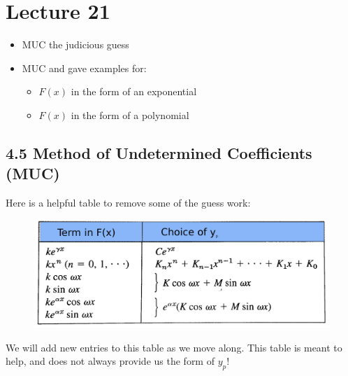 \chapter*{Lecture 21}
\begin{recall}{}{}
\begin{itemize}
\item MUC the judicious guess
\item MUC and gave examples for:
\begin{itemize}
\item $F(x)$ in the form of an exponential
\item $F(x)$ in the form of a polynomial
\end{itemize}

\end{itemize}
\end{recall}






\section*{4.5 Method of Undetermined Coefficients (MUC)}
Here is a helpful table to remove some of the guess work:
\begin{figure}[h!]
\includegraphics[width=\textwidth]{figs/MUC_2.png} 
\end{figure}
We will add new entries to this table as we move along. This table is meant to help, and does not always provide us the form of $y_p$!


